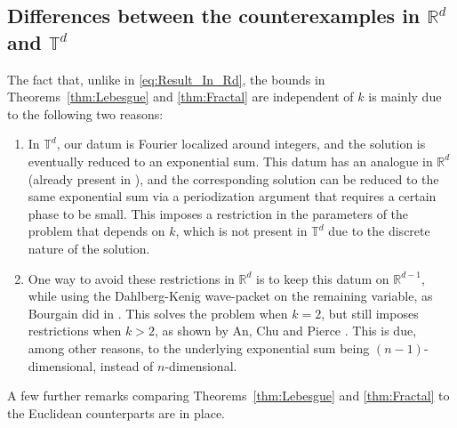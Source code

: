 \documentclass[11pt,reqno]{amsart}
\theoremstyle{definition}
\numberwithin{equation}{section}
\theoremstyle{remark}
\begin{document}
\subsection{Differences between the counterexamples in $\mathbb R^d$ and $\mathbb T^d$}\label{sec:Differences_Euclidean_Periodic}
The fact that, unlike in \eqref{eq:Result_In_Rd}, the bounds in Theorems~\ref{thm:Lebesgue} and \ref{thm:Fractal} are independent of $k$ is mainly due to the following two reasons:
\begin{enumerate}[1.]
    \item In $\mathbb T^d$, our datum is Fourier localized around integers, and the solution is eventually reduced to an exponential sum. 
    This datum has an analogue in $\mathbb R^d$ (already present in \cite{LucaRogers2017}), and the corresponding solution can be reduced to the same exponential sum via a periodization argument that requires a certain phase to be small. 
    This imposes a restriction in the parameters of the problem that depends on $k$,  
    which is not present in $\mathbb T^d$ due to the discrete nature of the solution. 

    \item One way to avoid these restrictions in $\mathbb R^d$ is to keep this datum on $\mathbb R^{d-1}$, while using the Dahlberg-Kenig wave-packet \cite{DahlbergKenig1982} on the remaining variable, as Bourgain did in \cite{Bourgain2016}. 
    This solves the problem when $k=2$, but still imposes restrictions when $k > 2$, as shown by An, Chu and Pierce \cite{AnChuPierce2023}. 
    This is due, among other reasons, to the underlying exponential sum being $(n-1)$-dimensional, instead of $n$-dimensional. 

\end{enumerate}
A few further remarks comparing Theorems~\ref{thm:Lebesgue} and \ref{thm:Fractal} to the Euclidean counterparts %
are in place.
\end{document}
